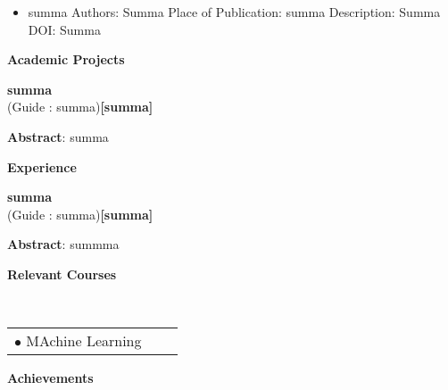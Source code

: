 \documentclass[a4paper,10pt]{article}
\begin{document}
    \begin{itemize}

\setlength{\itemsep}{1pt}
\item summa
\newline Authors: Summa
\newline Place of Publication: summa
\newline Description: Summa
\newline DOI: Summa

\end{itemize}

\colorbox{titleColor}{\parbox{6.7in}{\textbf{Academic Projects}}}

\begin{itemize*}
\setlength{\itemsep}{1pt}
\item \textbf{summa}
 \\ {(Guide : summa)}\hfill {\small{{\textbf{[summa]}}\/}}
\begin{itemize*}
\setlength{\itemsep}{.00pt}

            \item \textbf{Abstract}: summa 

            \end{itemize*} 

            \end{itemize*} 

\colorbox{titleColor}{\parbox{6.7in}{\textbf{Experience}}}

\begin{itemize*}
\setlength{\itemsep}{1pt}
\item \textbf{summa}
 \\ {(Guide : summa)}\hfill {\small{{\textbf{[summa]}}\/}}
\begin{itemize*}
\setlength{\itemsep}{.00pt}

            \item \textbf{Abstract}: summma 

            \end{itemize*} 

            \end{itemize*} 

\colorbox{titleColor}{\parbox{6.7in}{\textbf{Relevant Courses}}}\\[0.08in]
    \begin{tabular}{p{3.5in}p{3in}p{2.5in}}
\hspace{0.9pc}$\bullet$ MAchine Learning
\end{tabular}

\colorbox{titleColor}{\parbox{6.7in}{\textbf{Achievements}}}\\[0.08in]
\end{document}
